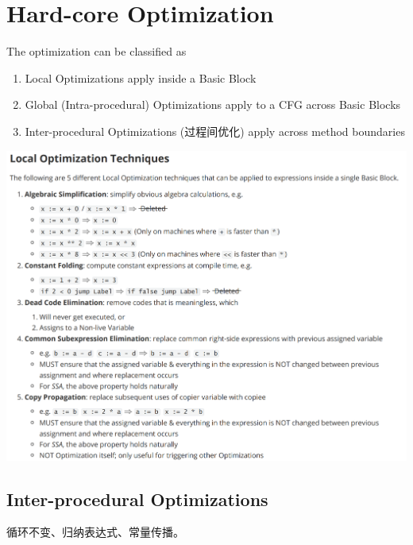 \documentclass[a4paper]{exam}
\theoremstyle{definition}
\begin{document}
\section{Hard-core Optimization}
The optimization can be classified as 
\begin{enumerate}
  \item Local Optimizations apply inside a Basic Block
  \item Global (Intra-procedural) Optimizations apply to a CFG across Basic Blocks
  \item Inter-procedural Optimizations (过程间优化) apply across method boundaries
\end{enumerate}
\includegraphics[width=16cm]{img/Snipaste_2021-05-31_17-49-19.png}
\subsection{Inter-procedural Optimizations}
循环不变、归纳表达式、常量传播。
\end{document}
